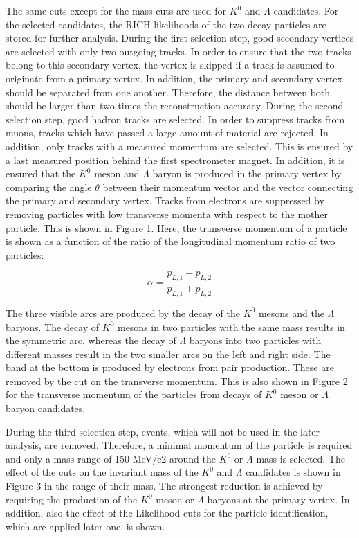 The same cuts except for the mass cuts are used for $K^0$ and $\Lambda$ candidates. For the selected candidates, the RICH likelihoods of the two decay particles are stored for
further analysis. During the first selection step, good secondary vertices are selected with only two outgoing tracks. In order to ensure that the two tracks belong
to this secondary vertex, the vertex is skipped if a track is assumed to originate from a primary vertex. In addition, the primary and secondary vertex should be
separated from one another. Therefore, the distance between both should be larger than two times the reconstruction accuracy.
During the second selection step, good hadron tracks are selected. In order to suppress tracks from muons, tracks which have passed a large amount of material are
rejected. In addition, only tracks with a measured momentum are selected. This is ensured by a last measured position behind the first spectrometer magnet. In addition,
it is ensured that the $K^0$ meson and $\Lambda$ baryon is produced in the primary vertex by comparing the angle $\theta$ between their momentum vector and the vector
connecting the primary and secondary vertex. Tracks from electrons are suppressed by removing particles with low transverse momenta with respect to the mother particle.
This is shown in Figure 1. Here, the transverse momentum of a particle is shown as a function of the ratio of the longitudinal momentum ratio of two particles:

\begin{equation}
  \alpha = \frac{p_{L,1}-p_{L,2}}{p_{L,1}+p_{L,2}}
\end{equation}

The three visible arcs are produced by the decay of the $K^0$ mesons and the $\Lambda$ baryons. The decay of $K^0$ mesons in two particles with the same mass results in the symmetric
arc, whereas the decay of $\Lambda$ baryons into two particles with different masses result in the two smaller arcs on the left and right side. The band at the bottom is
produced by electrons from pair production. These are removed by the cut on the transverse momentum. This is also shown in Figure 2 for the transverse momentum of the
particles from decays of $K^0$ meson or $\Lambda$ baryon candidates.

During the third selection step, events, which will not be used in the later analysis, are removed. Therefore, a minimal momentum of the particle is required and only a
mass range of 150 MeV/c2 around the $K^0$ or $\Lambda$ mass is selected. The effect of the cuts on the invariant mass of the $K^0$ and $\Lambda$ candidates is shown in Figure 3 in the range
of their mass. The strongest reduction is achieved by requiring the production of the $K^0$ meson or $\Lambda$ baryons at the primary vertex.
In addition, also the effect of the Likelihood cuts for the particle identification, which are applied later one, is shown.

